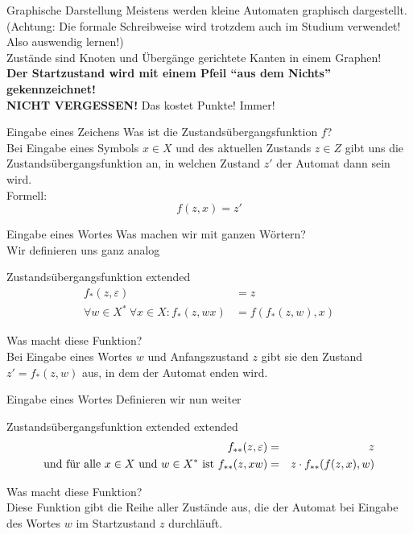 \begin{frame}{}
	\begin{block}{Graphische Darstellung}
		Meistens werden kleine Automaten graphisch dargestellt. (Achtung: Die formale Schreibweise wird trotzdem auch im Studium verwendet! Also auswendig lernen!)\\
		Zustände sind Knoten und Übergänge gerichtete Kanten in einem Graphen!\\
		\textbf{Der Startzustand wird mit einem Pfeil \enquote{aus dem Nichts} gekennzeichnet!}\\ \pause
		\textbf{NICHT VERGESSEN!} Das kostet Punkte! Immer!
	\end{block}
\end{frame}



\begin{frame}{Eingabe eines Zeichens}
	Was ist die Zustandsübergangsfunktion $f$? \\ \pause
	Bei Eingabe eines Symbols $x\in X$ und des aktuellen Zustands $z\in Z$ gibt uns die Zustandsübergangsfunktion an, in welchen Zustand $z'$ der Automat dann sein wird. \pause \\
	Formell: $$ f(z,x) = z' $$ 
\end{frame}

\begin{frame}{Eingabe eines Wortes}
	Was machen wir mit ganzen Wörtern? \\ \pause
	Wir definieren uns ganz analog
	\begin{block}{Zustandsübergangsfunktion extended}
	\begin{align*}
		 	f_*(z,\varepsilon) &= z \\
		 	\forall w\in X^* \ \forall x\in X : f_*(z,wx) &= f(f_*(z,w),x) 
	\end{align*}
	\end{block}
	\pause Was macht diese Funktion? \\ \pause
	Bei Eingabe eines Wortes $w$ und Anfangszustand $z$ gibt sie den Zustand $z' = f_*(z,w)$ aus, in dem der Automat enden wird. 
\end{frame}
	
\begin{frame}{Eingabe eines Wortes}
	Definieren wir nun weiter 
	\begin{block}{Zustandsübergangsfunktion extended extended}
		\begin{eqnarray*}
			f_{**}(z, \varepsilon) &=& z \\
			\text{und für alle $x\in X$ und $w\in X^*$ ist\ }
			f_{**}(z, xw)   &=& z \cdot f_{**}(f(z,x),w) \\
		\end{eqnarray*}
	\end{block}
	\pause Was macht diese Funktion? \\ \pause
	Diese Funktion gibt die Reihe aller Zustände aus, die der Automat bei Eingabe des Wortes $w$ im Startzustand $z$ durchläuft. 
\end{frame}

